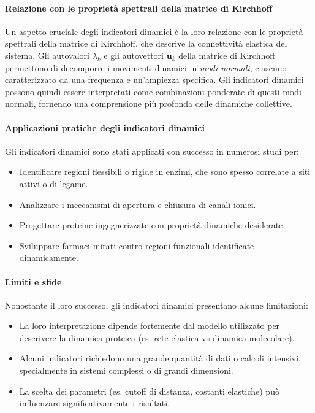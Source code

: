 \documentclass[Lau,binding=0.6cm,oneside,noexaminfo]{sapthesis}
\begin{document}
\paragraph{Relazione con le proprietà spettrali della matrice di Kirchhoff}
Un aspetto cruciale degli indicatori dinamici è la loro relazione con le proprietà spettrali della matrice di Kirchhoff, che descrive la connettività elastica del sistema. Gli autovalori $\lambda_k$ e gli autovettori $\mathbf{u}_k$ della matrice di Kirchhoff permettono di decomporre i movimenti dinamici in \textit{modi normali}, ciascuno caratterizzato da una frequenza e un'ampiezza specifica. Gli indicatori dinamici possono quindi essere interpretati come combinazioni ponderate di questi modi normali, fornendo una comprensione più profonda delle dinamiche collettive.

\paragraph{Applicazioni pratiche degli indicatori dinamici}
Gli indicatori dinamici sono stati applicati con successo in numerosi studi per:
\begin{itemize}
    \item Identificare regioni flessibili o rigide in enzimi, che sono spesso correlate a siti attivi o di legame.
    \item Analizzare i meccanismi di apertura e chiusura di canali ionici.
    \item Progettare proteine ingegnerizzate con proprietà dinamiche desiderate.
    \item Sviluppare farmaci mirati contro regioni funzionali identificate dinamicamente.
\end{itemize}

\paragraph{Limiti e sfide}
Nonostante il loro successo, gli indicatori dinamici presentano alcune limitazioni:
\begin{itemize}
    \item La loro interpretazione dipende fortemente dal modello utilizzato per descrivere la dinamica proteica (es. rete elastica vs dinamica molecolare).
    \item Alcuni indicatori richiedono una grande quantità di dati o calcoli intensivi, specialmente in sistemi complessi o di grandi dimensioni.
    \item La scelta dei parametri (es. cutoff di distanza, costanti elastiche) può influenzare significativamente i risultati.
\end{itemize}
\end{document}

